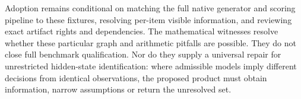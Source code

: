 Adoption remains conditional on matching the full native generator and scoring pipeline to these fixtures, resolving per-item visible information, and reviewing exact artifact rights and dependencies. The mathematical witnesses resolve whether these particular graph and arithmetic pitfalls are possible. They do not close full benchmark qualification. Nor do they supply a universal repair for unrestricted hidden-state identification: where admissible models imply different decisions from identical observations, the proposed product must obtain information, narrow assumptions or return the unresolved set.\citep{exec25_bor_reference}
